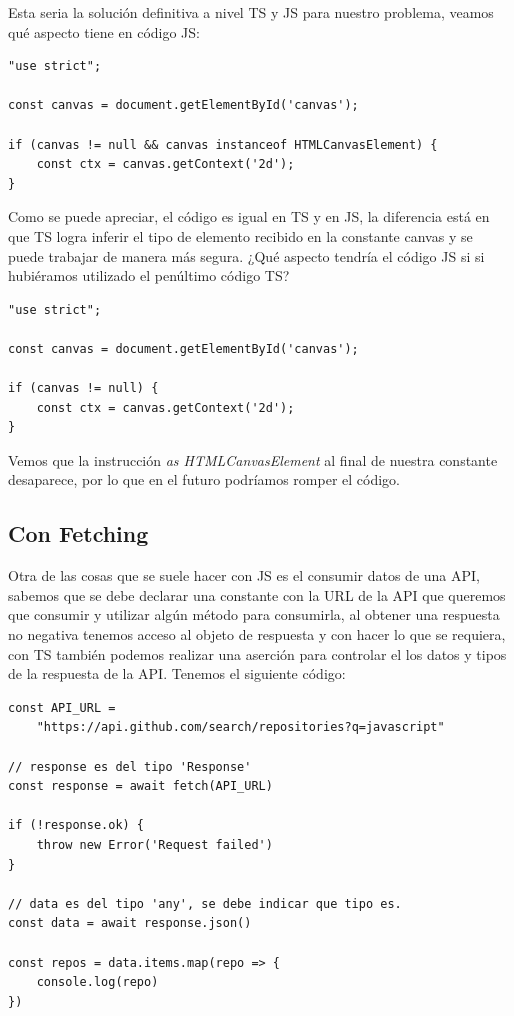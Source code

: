 Esta seria la solución definitiva a nivel TS y JS para nuestro problema, veamos qué aspecto tiene en código JS:
\begin{lstlisting}
"use strict";

const canvas = document.getElementById('canvas');

if (canvas != null && canvas instanceof HTMLCanvasElement) {
    const ctx = canvas.getContext('2d');
}
\end{lstlisting}

Como se puede apreciar, el código es igual en TS y en JS, la diferencia está en que TS logra inferir el tipo de elemento recibido en la constante canvas y se puede trabajar de manera más segura. ¿Qué aspecto tendría el código JS si si hubiéramos utilizado el penúltimo código TS?
\begin{lstlisting}
"use strict";

const canvas = document.getElementById('canvas');

if (canvas != null) {
    const ctx = canvas.getContext('2d');
}
\end{lstlisting}

Vemos que la instrucción \textit{as HTMLCanvasElement} al final de nuestra constante desaparece, por lo que en el futuro podríamos romper el código.


\subsection{Con Fetching}

Otra de las cosas que se suele hacer con JS es el consumir datos de una API, sabemos que se debe declarar una constante con la URL de la API que queremos que consumir y utilizar algún método para consumirla, al obtener una respuesta no negativa tenemos acceso al objeto de respuesta y con hacer lo que se requiera, con TS también podemos realizar una aserción para controlar el los datos y tipos de la respuesta de la API. Tenemos el siguiente código:
\begin{lstlisting}
const API_URL =
    "https://api.github.com/search/repositories?q=javascript"

// response es del tipo 'Response'
const response = await fetch(API_URL)

if (!response.ok) {
    throw new Error('Request failed')
}

// data es del tipo 'any', se debe indicar que tipo es.
const data = await response.json()

const repos = data.items.map(repo => {
    console.log(repo)
})
\end{lstlisting}

